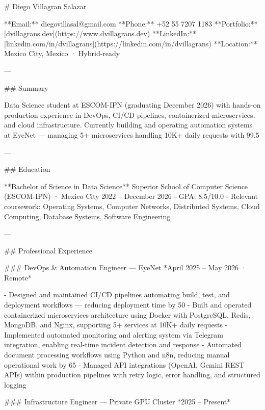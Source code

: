 # Diego Villagran Salazar

**Email:** diegovillasal@gmail.com  
**Phone:** +52 55 7207 1183  
**Portfolio:** [dvillagrans.dev](https://www.dvillagrans.dev)  
**LinkedIn:** [linkedin.com/in/dvillagrans](https://linkedin.com/in/dvillagrans)  
**Location:** Mexico City, Mexico · Hybrid-ready

---

## Summary

Data Science student at ESCOM-IPN (graduating December 2026) with hands-on production experience in DevOps, CI/CD pipelines, containerized microservices, and cloud infrastructure. Currently building and operating automation systems at EyeNet — managing 5+ microservices handling 10K+ daily requests with 99.5%

---

## Education

**Bachelor of Science in Data Science**  
Superior School of Computer Science (ESCOM-IPN) · Mexico City  
2022 – December 2026  
- GPA: 8.5/10.0
- Relevant coursework: Operating Systems, Computer Networks, Distributed Systems, Cloud Computing, Database Systems, Software Engineering

---

## Professional Experience

### DevOps & Automation Engineer — EyeNet
*April 2025 – May 2026 · Remote*

- Designed and maintained CI/CD pipelines automating build, test, and deployment workflows — reducing deployment time by 50%
- Built and operated containerized microservices architecture using Docker with PostgreSQL, Redis, MongoDB, and Nginx, supporting 5+ services at 10K+ daily requests
- Implemented automated monitoring and alerting system via Telegram integration, enabling real-time incident detection and response
- Automated document processing workflows using Python and n8n, reducing manual operational work by 65%
- Managed API integrations (OpenAI, Gemini REST APIs) within production pipelines with retry logic, error handling, and structured logging

### Infrastructure Engineer — Private GPU Cluster
*2025 – Present*

